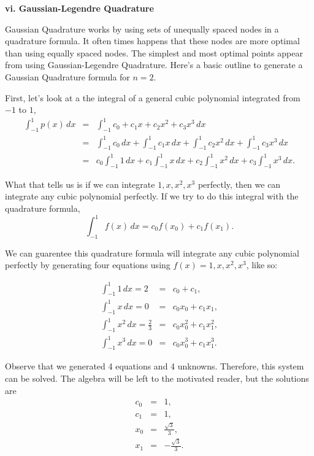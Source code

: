 \documentclass[12pt]{article}
\newcommand{\newLine}{\vspace{5mm}}
\newcommand{\nextsubsection}[1]{\newLine \noindent \large \textbf{#1} \normalsize}
\newcommand{\integral}[3]{\text{$\int^{#2}_{#1} #3\,dx$}}
\begin{document}
\nextsubsection{vi. Gaussian-Legendre Quadrature}

\newLine Gaussian Quadrature works by using sets of unequally spaced nodes in a quadrature formula. It often times happens that these nodes are more optimal than using equally spaced nodes. The simplest and most optimal points appear from using Gaussian-Legendre Quadrature. Here's a basic outline to generate a Gaussian Quadrature formula for $n=2$.

First, let's look at a the integral of a general cubic polynomial integrated from $-1$ to $1$,
\begin{eqnarray*} \integral{-1}{1}{p(x)} &=& \integral{-1}{1}{c_0 + c_1x + c_2x^2 + c_3x^3} \\
&=& \integral{-1}{1}{c_0} + \integral{-1}{1}{c_1x} + \integral{-1}{1}{c_2x^2} + \integral{-1}{1}{c_3x^3} \\
&=& c_0\integral{-1}{1}{1} + c_1\integral{-1}{1}{x} + c_2\integral{-1}{1}{x^2} + c_3\integral{-1}{1}{x^3}.
\end{eqnarray*}

What that tells us is if we can integrate $1,x,x^2,x^3$ perfectly, then we can integrate any cubic polynomial perfectly. If we try to do this integral with the quadrature formula,
\begin{equation*} \integral{-1}{1}{f(x)} = c_0f(x_0) + c_1f(x_1). \end{equation*}

We can guarentee this quadrature formula will integrate any cubic polynomial perfectly by generating four equations using $f(x)=1,x,x^2,x^3$, like so:

\begin{eqnarray*} \integral{-1}{1}{1} = 2 &=& c_0 + c_1, \\
\integral{-1}{1}{x} = 0 &=& c_0x_0 + c_1x_1, \\
\integral{-1}{1}{x^2} = \frac{2}{3} &=& c_0x_0^2 + c_1x_1^2, \\
\integral{-1}{1}{x^3} = 0 &=& c_0x_0^3 + c_1x_1^3.
\end{eqnarray*}

Observe that we generated 4 equations and 4 unknowns. Therefore, this system can be solved. The algebra will be left to the motivated reader, but the solutions are 
\begin{eqnarray*} c_0 &=& 1, \\
c_1 &=& 1, \\
x_0 &=& \frac{\sqrt{3}}{3}, \\
x_1 &=& -\frac{\sqrt{3}}{3}.
\end{eqnarray*}
\end{document}
